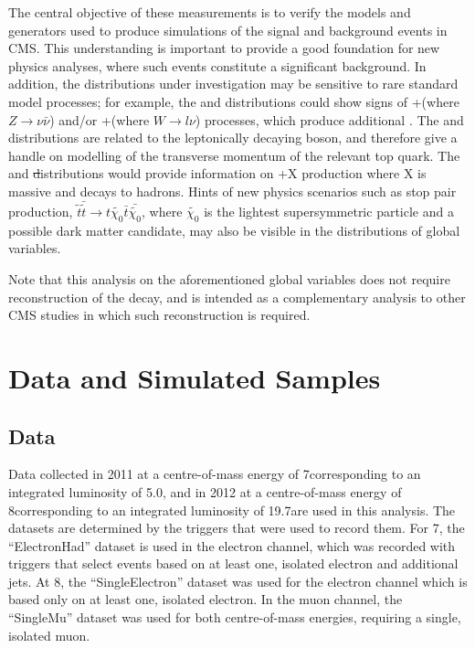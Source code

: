 The central objective of these measurements is to verify the models and generators used to produce simulations
of the signal and background events in CMS. This understanding is important to provide a good foundation for
new physics analyses, where such events constitute a significant background. In addition, the distributions
under investigation may be sensitive to rare standard model processes; for example, the \met and \mt
distributions could show signs of \ttbar+\Z (where $Z\rightarrow \nu\bar{\nu}$) and/or \ttbar+\W (where
$W\rightarrow l\nu$) processes, which produce additional \met. The \wpt and \mt distributions are related to
the leptonically decaying \W boson, and therefore give a handle on modelling of the transverse momentum of the
relevant top quark. The \HT and \st distributions would provide information on \ttbar+X production where X is
massive and decays to hadrons. Hints of new physics scenarios such as stop pair production,
$\tilde{t}\bar{\tilde{t}} \rightarrow t\tilde{\chi_0} \bar{t}\bar{\tilde{\chi_0}}$, where $\tilde{\chi_0}$ is
the lightest supersymmetric particle and a possible dark matter candidate, may also be visible in the
distributions of global variables.

Note that this analysis on the aforementioned global variables does not require reconstruction of the \ttbar
decay, and is intended as a complementary analysis to other CMS studies in which such reconstruction is
required.


\section{Data and Simulated Samples}
\label{s:data_and_simulated_samples}

\subsection{Data}
\label{ss:data}

Data collected in 2011 at a centre-of-mass energy of 7\TeV corresponding to an integrated luminosity of
5.0\fbinv, and in 2012 at a centre-of-mass energy of 8\TeV corresponding to an integrated luminosity of
19.7\fbinv are used in this analysis. The datasets are determined by the triggers that were used to record
them. For 7\TeV, the ``ElectronHad'' dataset is used in the electron channel, which was recorded with triggers
that select events based on at least one, isolated electron and additional jets. At 8\TeV, the
``SingleElectron'' dataset was used for the electron channel which is based only on at least one, isolated
electron. In the muon channel, the ``SingleMu'' dataset was used for both centre-of-mass energies, requiring a
single, isolated muon.

